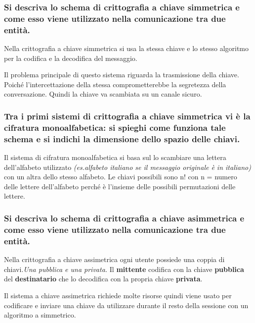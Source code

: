 \documentclass{article}
\begin{document}

\subsubsection*{Si descriva lo schema di crittografia a chiave simmetrica e come esso viene utilizzato nella comunicazione tra due entità.}

Nella crittografia a chiave simmetrica si usa la stessa chiave e lo stesso algoritmo per la codifica e la decodifica del messaggio.

Il problema principale di questo sistema riguarda la trasmissione della chiave. Poiché l'intercettazione della stessa comprometterebbe la segretezza della conversazione.
Quindi la chiave va scambiata su un canale sicuro.

\subsubsection*{ Tra i primi sistemi di crittografia a chiave simmetrica vi è la cifratura monoalfabetica: si spieghi come funziona tale schema e si indichi la dimensione dello spazio delle chiavi.}

Il sistema di cifratura monoalfabetica si basa sul lo scambiare una lettera dell'alfabeto utilizzato \textit{(es.alfabeto italiano se il messaggio originale è in italiano)} con un altra dello stesso alfabeto.
Le chiavi possibili sono n! con n = numero delle lettere dell'alfabeto perché è l'insieme delle possibili permutazioni delle lettere.

\subsubsection*{Si descriva lo schema di crittografia a chiave asimmetrica e come esso viene utilizzato nella comunicazione tra due entità.}

Nella crittografia a chiave assimetrica ogni utente possiede una coppia di chiavi.\textit{Una pubblica e una privata.}
Il \textbf{mittente} codifica con la chiave \textbf{pubblica} del \textbf{destinatario} che lo decodifica con la propria chiave \textbf{privata}.

Il sistema a chiave assimetrica richiede molte risorse quindi viene usato per codificare e inviare una chiave da
utilizzare durante il resto della sessione con un algoritmo a simmetrico.
\end{document}
